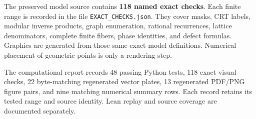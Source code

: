 The preserved model source contains \textbf{118 named exact checks}. Each finite range is recorded in the file \texttt{EXACT\_CHECKS.json}. They cover masks, CRT labels, modular inverse products, graph enumeration, rational recurrences, lattice denominators, complete finite fibers, phase identities, and defect formulas. Graphics are generated from those same exact model definitions. Numerical placement of geometric points is only a rendering step.

The computational report records 48 passing Python tests, 118 exact visual checks, 22 byte-matching regenerated vector plates, 13 regenerated PDF/PNG figure pairs, and nine matching numerical summary rows. Each record retains its tested range and source identity. Lean replay and source coverage are documented separately.

